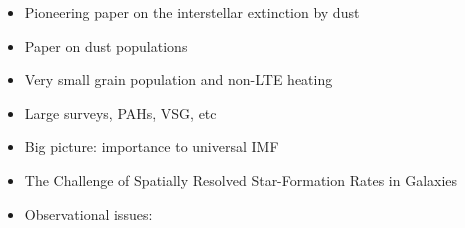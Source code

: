 \begin{itemize}
\item \citep{Mathis:1990jk} Pioneering paper on the interstellar extinction by dust
\item \citep{Weingartner:2001du} Paper on dust populations
\item \citep{Li:2001gk} Very small grain population and non-LTE heating
\item \citep{Compiegne:2010kk} Large surveys, PAHs, VSG, etc
\item \citep{Bastian:2010ig} Big picture: importance to universal IMF
\item \citep{Kennicutt:2012ey} The Challenge of Spatially Resolved Star-Formation Rates in Galaxies
\item \citep{Hennebelle:2012dk} Observational issues: 

\end{itemize}



